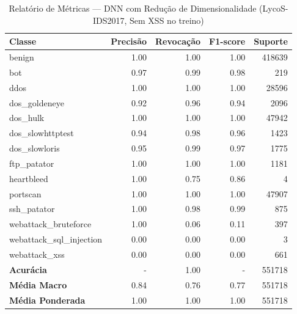 \begin{table}[H]
    \centering
    \small
    \begin{tabular}{lrrrr}
        \hline
        Classe                    & Precisão & Revocação & F1-score & Suporte \\
        \hline
        benign                    & 1.00     & 1.00      & 1.00     & 418639  \\
        bot                       & 0.97     & 0.99      & 0.98     & 219     \\
        ddos                      & 1.00     & 1.00      & 1.00     & 28596   \\
        dos\_goldeneye            & 0.92     & 0.96      & 0.94     & 2096    \\
        dos\_hulk                 & 1.00     & 1.00      & 1.00     & 47942   \\
        dos\_slowhttptest         & 0.94     & 0.98      & 0.96     & 1423    \\
        dos\_slowloris            & 0.95     & 0.99      & 0.97     & 1775    \\
        ftp\_patator              & 1.00     & 1.00      & 1.00     & 1181    \\
        heartbleed                & 1.00     & 0.75      & 0.86     & 4       \\
        portscan                  & 1.00     & 1.00      & 1.00     & 47907   \\
        ssh\_patator              & 1.00     & 0.98      & 0.99     & 875     \\
        webattack\_bruteforce     & 1.00     & 0.06      & 0.11     & 397     \\
        webattack\_sql\_injection & 0.00     & 0.00      & 0.00     & 3       \\
        webattack\_xss            & 0.00     & 0.00      & 0.00     & 661     \\
        \hline
        \textbf{Acurácia}         & -        & 1.00      & -        & 551718  \\
        \textbf{Média Macro}      & 0.84     & 0.76      & 0.77     & 551718  \\
        \textbf{Média Ponderada}  & 1.00     & 1.00      & 1.00     & 551718  \\
        \hline
    \end{tabular}
    \caption{Relatório de Métricas — DNN com Redução de Dimensionalidade (LycoS-IDS2017, Sem XSS no treino)}
    \label{table:dnn_lycos_reducao_sem_xss_metricas}
\end{table}
